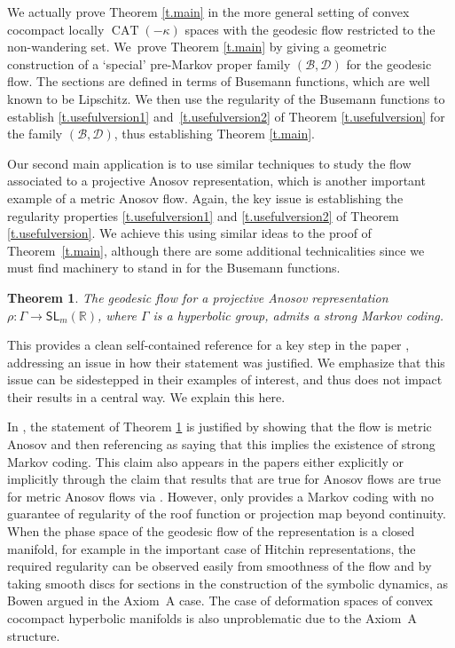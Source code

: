 \documentclass[11pt]{article}
\let\mathcal\mathscr
\newtheorem{thmx}{Theorem}
\theoremstyle{definition}
\numberwithin{equation}{section}
\DeclareMathOperator{\CAT}{CAT}
\newcommand\DDD{\mathcal D}
\newcommand\BBB{\mathcal B}
\begin{document}
We actually prove Theorem \ref{t.main} in the more general setting of convex cocompact locally $\CAT(-\kappa)$ spaces with the geodesic flow restricted to the non-wandering set. We~prove Theorem \ref{t.main} by giving a geometric construction of a `special' pre-Markov proper family $(\BBB, \DDD)$ for the geodesic flow. The sections are defined in terms of Busemann functions, which are well known to be Lipschitz. We then use the regularity of the Busemann functions to establish \eqref{t.usefulversion1} and~\eqref{t.usefulversion2} of Theorem \ref{t.usefulversion} for the family $(\BBB, \DDD)$, thus establishing Theorem \ref{t.main}.

Our second main application is to use similar techniques to study the flow associated to a projective Anosov representation, which is another important example of a metric Anosov flow. Again, the key issue is establishing the regularity properties \eqref{t.usefulversion1} and \eqref{t.usefulversion2} of Theorem \ref{t.usefulversion}. We achieve this using similar ideas to the proof of Theorem~\ref{t.main}, although there are some additional technicalities since we must find machinery to stand in for the Busemann functions.

\begin{thmx} \label{t.main2}
The geodesic flow for a projective Anosov representation $\rho: \Gamma \to \mathsf{SL}_m(\mathbb{R})$, where $\Gamma$ is a hyperbolic group, admits a strong Markov coding.
\end{thmx}

This provides a clean self-contained reference for a key step in the paper \cite{bcls}, addressing an issue in how their statement was justified. We emphasize that this issue can be sidestepped in their examples of interest, and thus does not impact their results in a central way. We explain this here.

In \cite{bcls}, the statement of Theorem \ref{t.main2} is justified by showing that the flow is metric Anosov \cite[Prop.\,5.1]{bcls} and then referencing \cite{pollicott} as saying that this implies the existence of strong Markov coding. This claim also appears in the papers \cite{BC17, BCLS18, PS17, aS16} either explicitly or implicitly through the claim that results that are true for Anosov flows are true for metric Anosov flows via \cite{pollicott}. However, \cite[Th.\,1]{pollicott} only provides a Markov coding with no guarantee of regularity of the roof function or projection map beyond continuity. When the phase space of the geodesic flow of the representation is a closed manifold, for example in the important case of Hitchin representations, the required regularity can be observed easily from smoothness of the flow and by taking smooth discs for sections in the construction of the symbolic dynamics, as Bowen argued in the Axiom~A case. The case of deformation spaces of convex cocompact hyperbolic manifolds is also unproblematic due to the Axiom~A structure.
\end{document}
